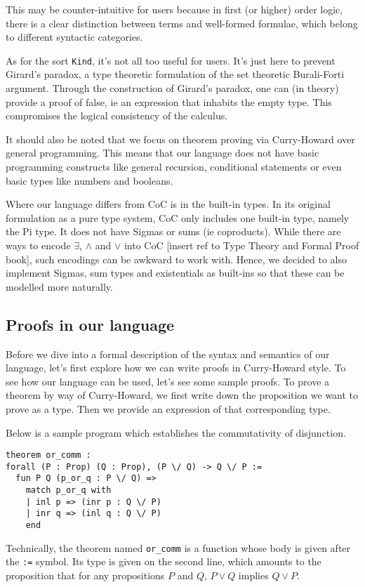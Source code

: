 \documentclass{article}
\begin{document}
This may be counter-intuitive for users because in first (or higher) order
logic, there is a clear distinction between terms and well-formed formulae,
which belong to different syntactic categories. 

As for the sort \verb|Kind|, it's not all too useful for users. It's
just here to prevent Girard's paradox, a type theoretic formulation of the set
theoretic Burali-Forti argument.
Through the construction of Girard's paradox, one can (in theory) provide a 
proof of false, ie an expression that inhabits the empty type.
This compromises the logical consistency of the calculus.

It should also be noted that we focus on theorem proving via Curry-Howard over
general programming. This means that our language does not have
basic programming constructs like general recursion, conditional statements or
even basic types like numbers and booleans.

Where our language differs from CoC is in the built-in types.
In its original formulation as a pure type system, CoC only includes one built-in
type, namely the Pi type. It does not have Sigmas or sums (ie coproducts).
While there are ways to encode $\exists$, $\wedge$ and $\vee$ into CoC
[insert ref to Type Theory and Formal Proof book], such encodings can be awkward
to work with. Hence, we decided to also implement Sigmas, sum types and
existentials as built-ins so that these can be modelled more naturally.

\subsection{Proofs in our language}
Before we dive into a formal description of the syntax and semantics of our
language, let's first explore how we can write proofs in Curry-Howard style.
To see how our language can be used, let's see some sample proofs.
To prove a theorem by way of Curry-Howard, we first write down the proposition
we want to prove as a type. Then we provide an expression of that corresponding
type.

Below is a sample program which establishes the commutativity of disjunction. 
\begin{verbatim}
theorem or_comm :
forall (P : Prop) (Q : Prop), (P \/ Q) -> Q \/ P :=
  fun P Q (p_or_q : P \/ Q) =>
    match p_or_q with
    | inl p => (inr p : Q \/ P)
    | inr q => (inl q : Q \/ P)
    end
\end{verbatim}

Technically, the theorem named \verb|or_comm| is a function whose body is given
after the \verb|:=| symbol. Its type is given on the second line, which amounts
to the proposition that for any propositions $P$ and $Q$, $P \vee Q$ implies 
$Q \vee P$.
\end{document}
